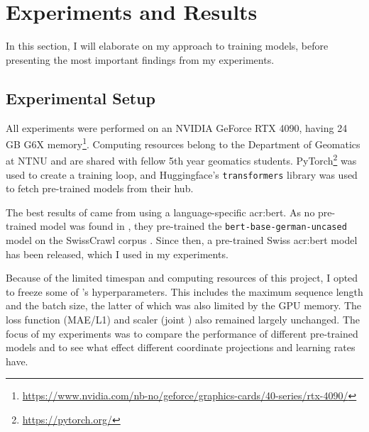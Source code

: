 \section{Experiments and Results}
\label{sec:Experiments}

In this section, I will elaborate on my approach to training models, before presenting the most important findings from my experiments.

\subsection{Experimental Setup}
\label{sec:experimentalSetup}


All experiments were performed on an NVIDIA GeForce RTX 4090, having 24 GB G6X memory\footnote{\url{https://www.nvidia.com/nb-no/geforce/graphics-cards/40-series/rtx-4090/}}. Computing resources belong to the Department of Geomatics at NTNU and are shared with fellow 5th year geomatics students. PyTorch\footnote{\url{https://pytorch.org/}} was used to create a training loop, and Huggingface's \texttt{transformers} library was used to fetch pre-trained models from their hub.

The best results of \cite{scherrerHeLjuVarDial20202020} came from using a language-specific \acrshort{acr:bert}. As no pre-trained model was found in \citeyear{scherrerHeLjuVarDial20202020}, they pre-trained the \texttt{bert-base-german-uncased} model on the SwissCrawl corpus \citep[3-4]{scherrerHeLjuVarDial20202020}. Since then, a pre-trained Swiss \acrshort{acr:bert} model has been released, which I used in my experiments.

Because of the limited timespan and computing resources of this project, I opted to freeze some of \citeauthor{scherrerHeLjuVarDial20202020}'s hyperparameters. This includes the maximum sequence length and the batch size, the latter of which was also limited by the GPU memory. The loss function (MAE/L1) and scaler (joint \citep[5]{scherrerHeLjuVarDial20202020}) also remained largely unchanged. The focus of my experiments was to compare the performance of different pre-trained models and to see what effect different coordinate projections and learning rates have.

